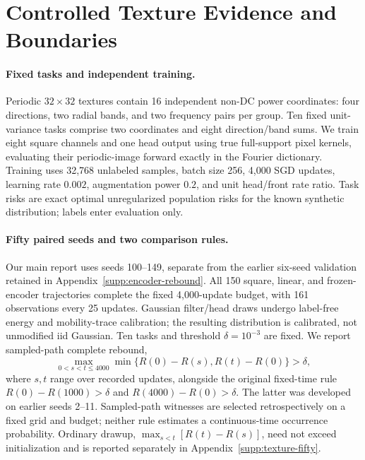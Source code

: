 \section{Controlled Texture Evidence and Boundaries}
\label{main:experiments}
\paragraph{Fixed tasks and independent training.}
Periodic $32\times32$ textures contain 16 independent non-DC power coordinates: four directions, two radial bands, and two frequency pairs per group. Ten fixed unit-variance tasks comprise two coordinates and eight direction/band sums. We train eight square channels and one head output using true full-support pixel kernels, evaluating their periodic-image forward exactly in the Fourier dictionary. Training uses 32,768 unlabeled samples, batch size 256, 4,000 SGD updates, learning rate $0.002$, augmentation power $0.2$, and unit head/front rate ratio. Task risks are exact optimal unregularized population risks for the known synthetic distribution; labels enter evaluation only.

\paragraph{Fifty paired seeds and two comparison rules.}
Our main report uses seeds 100--149, separate from the earlier six-seed validation retained in Appendix~\ref{supp:encoder-rebound}. All 150 square, linear, and frozen-encoder trajectories complete the fixed 4,000-update budget, with 161 observations every 25 updates. Gaussian filter/head draws undergo label-free energy and mobility-trace calibration; the resulting distribution is calibrated, not unmodified iid Gaussian. Ten tasks and threshold $\delta=10^{-3}$ are fixed. We report sampled-path complete rebound,
\begin{equation}
 \max_{0<s<t\le4000}\min\{R(0)-R(s),R(t)-R(0)\}>\delta,
 \label{main:empirical-rebound-rule}
\end{equation}
where $s,t$ range over recorded updates, alongside the original fixed-time rule $R(0)-R(1000)>\delta$ and $R(4000)-R(0)>\delta$. The latter was developed on earlier seeds 2--11. Sampled-path witnesses are selected retrospectively on a fixed grid and budget; neither rule estimates a continuous-time occurrence probability. Ordinary drawup, $\max_{s<t}[R(t)-R(s)]$, need not exceed initialization and is reported separately in Appendix~\ref{supp:texture-fifty}.


